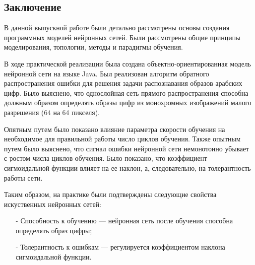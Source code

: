 \begin{center}
\section*{Заключение}
\end{center}

В данной выпускной работе были детально рассмотрены основы создания программных моделей нейронных сетей.
Были рассмотрены общие принципы моделирования, топологии, методы и парадигмы обучения.

В ходе практической реализации была создана объектно-ориентированная модель нейронной сети на языке Java.
Был реализован алгоритм обратного распространения ошибки для решения задачи распознавания образов арабских цифр.
Было выяснено, что однослойная сеть прямого распространения способна должным образом определять образы цифр из монохромных изображений малого разрешения (64 на 64 пикселя).

Опятным путем было показано влияние параметра скорости обучения на необходимое для правильной работы число циклов обучения.
Также опытным путем было выяснено, что сигнал ошибки нейронной сети немонотонно убывает с ростом числа циклов обучения.
Было показано, что коэффициент сигмоидальной функции влияет на ее наклон, а, следовательно, на толерантность работы сети.

Таким образом, на практике были подтверждены следующие свойства искуственных нейронных сетей:
\begin{itemize}
\item[-] Способность к обучению --- нейронная сеть после обучения способна определять образ цифры;
\item[-] Толерантность к ошибкам --- регулируется коэффициентом наклона сигмоидальной функции.
\end{itemize}


\newpage